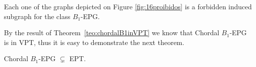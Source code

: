   \begin{corollary}\label{c:prohib}
  Each one of the graphs depicted on Figure \ref{fig:16proibidos} is a forbidden induced subgraph for the class $B_1$-EPG.
  \end{corollary}







By the result of Theorem~\ref{teo:chordalB1inVPT} we know that Chordal $B_1$-EPG is in VPT, thus it is easy to demonstrate the next theorem.

\begin{theorem}\label{teo:b1epgept}
Chordal $B_1$-EPG $\subsetneq$ EPT. 
\end{theorem}


